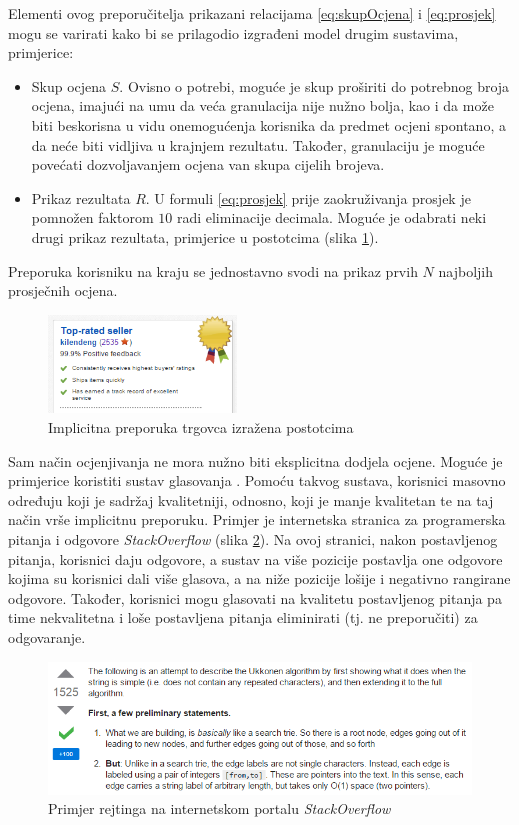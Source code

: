 \documentclass[times, utf8, diplomski, numeric]{fer}
\begin{document}
Elementi ovog preporučitelja prikazani relacijama \ref{eq:skupOcjena} i
\ref{eq:prosjek} mogu se varirati kako bi se prilagodio izgrađeni model drugim
sustavima, primjerice:
\begin{itemize}
  \item Skup ocjena $S$. Ovisno o potrebi, moguće je skup proširiti do potrebnog
  broja ocjena, imajući na umu da veća granulacija nije nužno bolja, kao i da
  može biti beskorisna u vidu onemogućenja korisnika da predmet ocjeni spontano,
  a da neće biti vidljiva u krajnjem rezultatu. Također, granulaciju je moguće
  povećati dozvoljavanjem ocjena van skupa cijelih brojeva.
  \item Prikaz rezultata $R$. U formuli \ref{eq:prosjek} prije zaokruživanja
  prosjek je pomnožen faktorom $10$ radi eliminacije decimala. Moguće je
  odabrati neki drugi prikaz rezultata, primjerice u postotcima (slika
  	\ref{fig:Ebay2}).
\end{itemize}
Preporuka korisniku na kraju se jednostavno svodi na prikaz prvih $N$ najboljih
prosječnih ocjena.

\begin{figure}[!htb]
	\centering
	\includegraphics[width=5cm]{images/neosobni/ebay2.png}
	\caption{Implicitna preporuka trgovca izražena postotcima}
	\label{fig:Ebay2}
\end{figure}

Sam način ocjenjivanja ne mora nužno biti eksplicitna dodjela ocjene. Moguće je
primjerice koristiti sustav glasovanja  . Pomoću takvog sustava, korisnici masovno određuju koji je sadržaj
kvalitetniji, odnosno, koji je manje kvalitetan te na taj način vrše implicitnu
preporuku. Primjer je internetska stranica za programerska pitanja i odgovore
\emph{StackOverflow} (slika \ref{fig:stackoverflow1}). Na ovoj stranici, nakon
postavljenog pitanja, korisnici daju odgovore, a sustav na više pozicije
postavlja one odgovore kojima su korisnici dali više glasova, a na niže pozicije
lošije i negativno rangirane odgovore. Također, korisnici mogu glasovati na
kvalitetu postavljenog pitanja pa time nekvalitetna i loše postavljena pitanja
eliminirati (tj. ne preporučiti) za odgovaranje. 

\begin{figure}[!htb]
	\centering
	\includegraphics[width=14.21cm]{images/neosobni/stackoverflow1.png}
	\caption{Primjer rejtinga na internetskom portalu \emph{StackOverflow}}
	\label{fig:stackoverflow1}
\end{figure}
\end{document}

